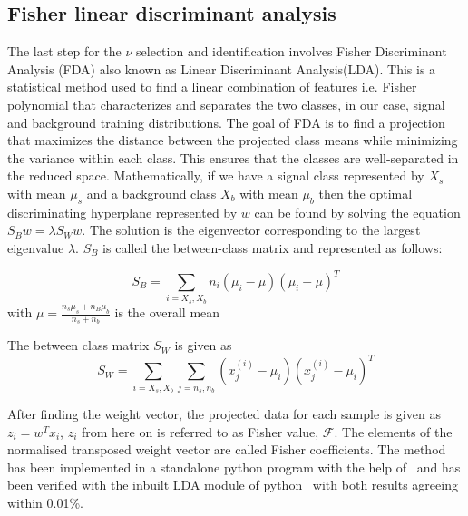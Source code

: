 \subsection{Fisher linear discriminant analysis}
\label{subsec:nu_sel_fisher}
The last step for the $\nu$ selection and identification involves Fisher Discriminant Analysis (FDA) also known as Linear Discriminant Analysis(LDA). This is a statistical method used to find a linear combination of features i.e. Fisher polynomial that characterizes and separates the two classes, in our case, signal and background training distributions. The goal of FDA is to find a projection that maximizes the distance between the projected class means while minimizing the variance within each class. This ensures that the classes are well-separated in the reduced space. Mathematically, if we have a signal class represented by $X_s$ with mean $\mu_s$ and a background class $X_b$ with mean $\mu_b$ then the optimal discriminating hyperplane represented by $w$ can be found by solving the equation $S_B w = \lambda S_W w$. The solution is the eigenvector corresponding to the largest eigenvalue $\lambda$. $S_B$ is called the between-class matrix and represented as follows: 

\begin{equation}
  S_B = \sum_{i = X_s,X_b} n_i (\mu_i - \mu)(\mu_i - \mu)^T
\end{equation}
with $\mu = \frac{n_s \mu_s + n_B \mu_b}{n_s + n_b}$ is the overall mean 

The between class matrix $S_W$ is given as
\begin{equation}
  S_W = \sum_{i = X_s,X_b} \sum_{j = n_s,n_b } (x^{(i)}_j - \mu_i) (x^{(i)}_j - \mu_i)^T
\end{equation}

After finding the weight vector, the projected data for each sample is given as $z_i = w^Tx_i$, $z_i$ from here on is referred to as Fisher value, $\mathcal{F}$. The elements of the normalised transposed weight vector are called Fisher coefficients. The method has been implemented in a standalone python program with the help of~\cite{JaimeAlvarezMuniz_conversation} and has been verified with the inbuilt LDA module of python~\cite{scikit_Learn} with both results agreeing within 0.01\%. 


